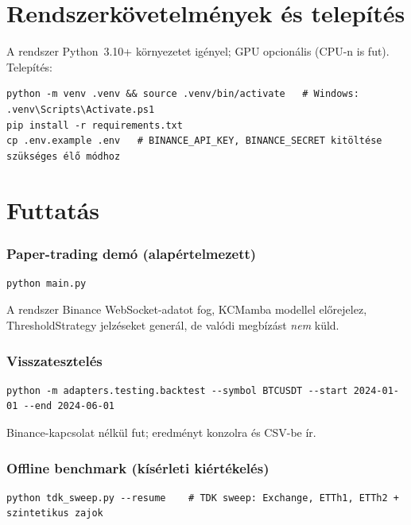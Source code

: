 \section{Rendszerkövetelmények és telepítés}

A rendszer Python~3.10+ környezetet igényel; GPU opcionális (CPU-n is fut).
Telepítés:

\begin{verbatim}
python -m venv .venv && source .venv/bin/activate   # Windows: .venv\Scripts\Activate.ps1
pip install -r requirements.txt
cp .env.example .env   # BINANCE_API_KEY, BINANCE_SECRET kitöltése szükséges élő módhoz
\end{verbatim}

\section{Futtatás}

\subsubsection*{Paper-trading demó (alapértelmezett)}

\begin{verbatim}
python main.py
\end{verbatim}


A rendszer Binance WebSocket-adatot fog, KCMamba modellel előrejelez,
ThresholdStrategy jelzéseket generál, de valódi megbízást \emph{nem}
küld.

\subsubsection*{Visszatesztelés}

\begin{verbatim}
python -m adapters.testing.backtest --symbol BTCUSDT --start 2024-01-01 --end 2024-06-01
\end{verbatim}

Binance-kapcsolat nélkül fut; eredményt konzolra és CSV-be ír.

\subsubsection*{Offline benchmark (kísérleti kiértékelés)}

\begin{verbatim}
python tdk_sweep.py --resume    # TDK sweep: Exchange, ETTh1, ETTh2 + szintetikus zajok
\end{verbatim}

